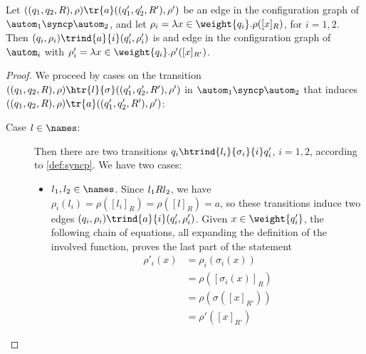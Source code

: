 \begin{proposition}
Let $((q_1,q_2,R),\rho) \tr{a} ((q_1',q_2',R'),\rho')$ be an edge in the configuration graph of $\autom_1 \syncp \autom_2$, and let $\rho_i = \lambda x \in \weight{q_i}.\rho([x]_R)$, for $i=1,2$. Then $(q_i,\rho_i) \trind{a}{i} (q_i',\rho_i')$ is and edge in the configuration graph of $\autom_i$ with $\rho'_i = \lambda x \in \weight{q_i}.\rho'([x]_{R'})$.
\end{proposition}
\begin{proof}
We proceed by cases on the transition $((q_1,q_2,R),\rho) \htr{l}{\sigma} ((q_1',q_2',R'),\rho')$ in $\autom_1 \syncp \autom_2$ that induces $((q_1,q_2,R),\rho) \tr{a} ((q_1',q_2',R'),\rho')$:
\begin{description}
	\item[Case $l \in \names$:] Then there are two transitions $q_i \htrind{l_i}{\sigma_i}{i} q_i'$, $i=1,2$, according to \cref{def:syncp}.
	We have two cases:
	\begin{itemize}
	\item $l_1,l_2 \in \names$.
	Since $l_1 R l_2$, we have $\rho_i(l_i) = \rho([l_i]_R) = \rho([l]_R) = a$, so these transitions induce two edges $(q_i,\rho_i) \trind{a}{i} (q_i',\rho_i')$.
	Given $x \in \weight{q_i'}$, the following chain of equations, all expanding the definition of the involved function, proves the last part of the statement
	\begin{align*}
		\rho'_i(x) &= \rho_i (\sigma_i (x) ) \\
		&= \rho([\sigma_i(x)]_R) \\
		&= \rho(\sigma([x]_{R'})) \\
		&= \rho'([x]_{R'}) 
	\end{align*}
	

\end{itemize}
\end{description}
\end{proof}
